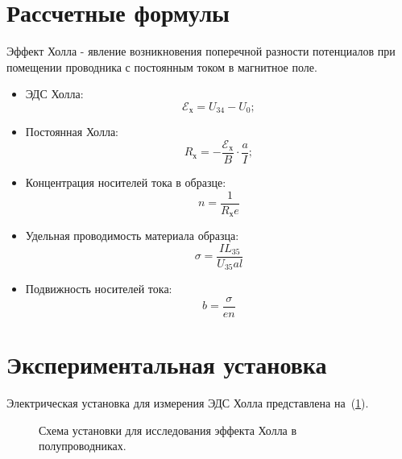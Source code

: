 \documentclass[a4paper,12pt]{article} %
\begin{document}
\section{Рассчетные формулы}
	Эффект Холла - явление возникновения поперечной разности потенциалов при помещении проводника с постоянным током в магнитное поле.
	\begin{itemize}
		\item
			ЭДС Холла:
			\begin{equation}
				\label{E}
				\mathscr{E_\text{х}} = U_{34} - U_0;
			\end{equation}
		\item
			Постоянная Холла:
			\begin{equation}
				\label{R}
				R_\text{х} = -\frac{\mathscr{E_\text{х}}}{B} \cdot \frac{a}{I};
			\end{equation}
		\item
			Концентрация носителей тока в образце:
			\begin{equation}
				\label{n}
				n = \frac{1}{R_\text{х} e}
			\end{equation}
		\item
			Удельная проводимость материала образца:
			\begin{equation}
				\label{sigma}
				\sigma = \frac{I L_{35}}{U_{35}al}
			\end{equation}
		\item
			Подвижность носителей тока:
			\begin{equation}
				\label{b}
				b = \frac{\sigma}{en}
			\end{equation}
		
	\end{itemize}
\section{Экспериментальная установка}
	Электрическая установка для измерения ЭДС Холла представлена на~(\ref{ris:ustanovka}).
	\begin{figure}[H]
		\caption{Схема установки для исследования эффекта Холла в полупроводниках.}
		\label{ris:ustanovka}
	\end{figure}
\newpage
\end{document}
